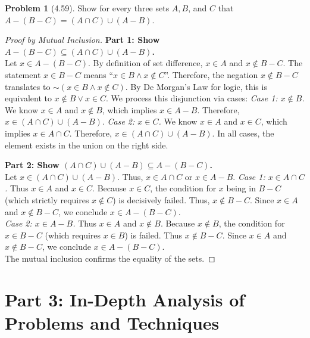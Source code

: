 \documentclass[11pt]{article}
\theoremstyle{definition}
\newtheorem{problem}{Problem}
\begin{document}
\begin{problem}[4.59]
Show for every three sets $A, B$, and $C$ that $A - (B - C) = (A \cap C) \cup (A - B)$.
\end{problem}
\begin{proof}[Proof by Mutual Inclusion]
\textbf{Part 1: Show $A - (B - C) \subseteq (A \cap C) \cup (A - B)$.} \\
Let $x \in A - (B - C)$. By definition of set difference, $x \in A$ and $x \notin B - C$.
The statement $x \in B - C$ means ``$x \in B \land x \notin C$''.
Therefore, the negation $x \notin B - C$ translates to $\sim(x \in B \land x \notin C)$.
By De Morgan's Law for logic, this is equivalent to $x \notin B \lor x \in C$.
We process this disjunction via cases:
\textit{Case 1: $x \notin B$.} We know $x \in A$ and $x \notin B$, which implies $x \in A - B$. Therefore, $x \in (A \cap C) \cup (A - B)$.
\textit{Case 2: $x \in C$.} We know $x \in A$ and $x \in C$, which implies $x \in A \cap C$. Therefore, $x \in (A \cap C) \cup (A - B)$.
In all cases, the element exists in the union on the right side.

\vspace{2mm}
\noindent\textbf{Part 2: Show $(A \cap C) \cup (A - B) \subseteq A - (B - C)$.} \\
Let $x \in (A \cap C) \cup (A - B)$. Thus, $x \in A \cap C$ or $x \in A - B$.
\textit{Case 1: $x \in A \cap C$.} Thus $x \in A$ and $x \in C$. Because $x \in C$, the condition for $x$ being in $B - C$ (which strictly requires $x \notin C$) is decisively failed. Thus, $x \notin B - C$. Since $x \in A$ and $x \notin B - C$, we conclude $x \in A - (B - C)$. \\
\textit{Case 2: $x \in A - B$.} Thus $x \in A$ and $x \notin B$. Because $x \notin B$, the condition for $x \in B - C$ (which requires $x \in B$) is failed. Thus $x \notin B - C$. Since $x \in A$ and $x \notin B - C$, we conclude $x \in A - (B - C)$. \\
The mutual inclusion confirms the equality of the sets.
\end{proof}

\newpage
\section{Part 3: In-Depth Analysis of Problems and Techniques}
\end{document}
